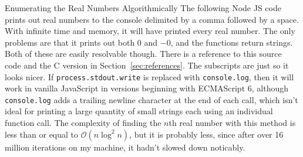 \documentclass[12pt]{article}
\begin{document}
\pagebreak\begin{section}{Enumerating the Real Numbers Algorithmically}\label{sec:algorithm code}
	The following Node JS code prints out real numbers to the console delimited by a comma followed
	by a space. With infinite time and memory, it will have printed every real number. The only
	problems are that it prints out both $0$ and $-0$, and the functions return strings. Both of
	these are easily resolvable though. There is a reference to this source code and the C version
	in Section~\ref{sec:references}. The subscripts are just so it looks nicer. If
	\texttt{process.stdout.write} is replaced with \texttt{console.log}, then it will work in vanilla
	JavaScript in versions beginning with ECMAScript 6, although \texttt{console.log} adds a trailing
	newline character at the end of each call, which isn't ideal for printing a large quantity of small
	strings each using an individual function call. The complexity of finding the $n$th real number
	with this method is less than or equal to $\mathcal O\!\left(n\log^2n\right)$, but it is probably
	less, since after over 16 million iterations on my machine, it hadn't slowed down noticably.


\end{section}
\end{document}

